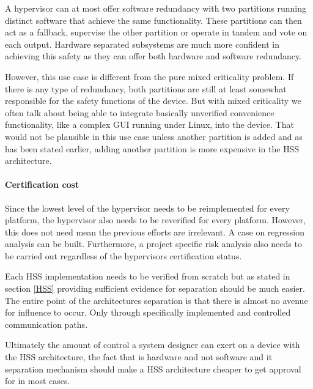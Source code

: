  A hypervisor can at most offer software redundancy with two partitions running distinct software that achieve the same functionality. These partitions can then act as a fallback, supervise the other partition or operate in tandem and vote on each output. Hardware separated subsystems are much more confident in achieving this safety as they can offer both hardware and software redundancy. 
 
However, this use case is different from the pure mixed criticality problem. If there is any type of redundancy, both partitions are still at least somewhat responsible for the safety functions of the device. But with mixed criticality we often talk about being able to integrate basically unverified convenience functionality, like a complex GUI running under Linux, into the device. That would not be plausible in this use case unless another partition is added and as has been stated earlier, adding another partition is more expensive in the \gls{HSS} architecture.

\paragraph{Certification cost}

Since the lowest level of the hypervisor needs to be reimplemented for every platform, the hypervisor also needs to be reverified for every platform. However, this does not need mean the previous efforts are irrelevant. A case on regression analysis can be built.
Furthermore, a project specific risk analysis also needs to be carried out regardless of the hypervisors certification status.

Each \gls{HSS} implementation needs to be verified from scratch but as stated in section \ref{HSS} providing sufficient evidence for separation should be much easier. The entire point of the architectures separation is that there is almost no avenue for influence to occur. Only through specifically implemented and controlled communication paths.

Ultimately the amount of control a system designer can exert on a device with the \gls{HSS} architecture, the fact that is hardware and not software and it separation mechanism should make a \gls{HSS} architecture cheaper to get approval for in most cases.

